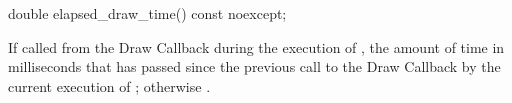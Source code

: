 \begin{itemdecl}
double elapsed_draw_time() const noexcept;
\end{itemdecl}
\begin{itemdescr}
\pnum
\returns
If called from the Draw Callback during the execution of , the amount of time in milliseconds that has passed since the previous call to the Draw Callback by the current execution of ; otherwise .
\end{itemdescr}
